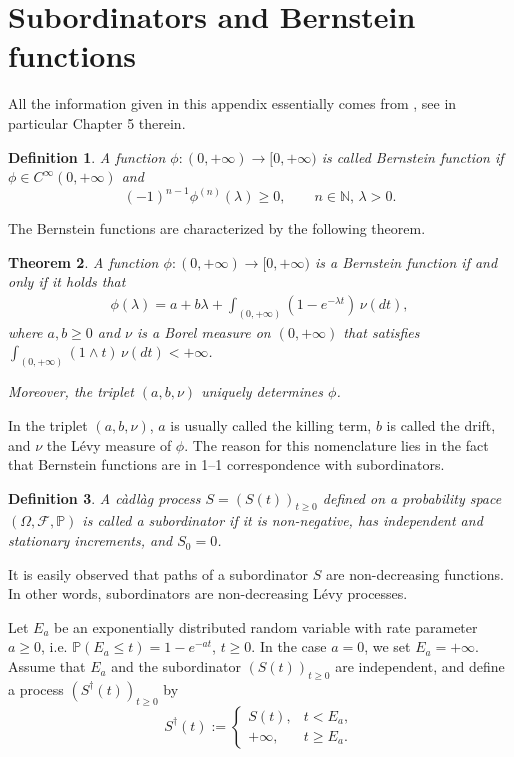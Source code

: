 \documentclass[reqno]{amsart}
\newtheorem{theorem}{Theorem}[section] %
\newtheorem{definition}[theorem]{Definition}
\theoremstyle{remark}
\numberwithin{equation}{section} %
\newcommand{\1}{\mathds{1}}
\begin{document}
	\appendix
	
	\section{Subordinators and Bernstein functions}
	\label{appendix_bernstein}
	
	All the information given in this appendix essentially comes from \cite{bernstein}, see in particular Chapter 5 therein.
	\begin{definition}
		A function $\phi : (0,+\infty) \to [0,+\infty)$ is called Bernstein function if $\phi\in C^{\infty}(0,+\infty)$ and
		$$
		(-1)^{n-1} \phi^{(n)}(\lambda) \ge 0, \qquad n \in \mathbb{N} ,\, \lambda > 0.
		$$
	\end{definition}
	
	The Bernstein functions are characterized by the following theorem. 
	
	\begin{theorem}
		A function $\phi : (0,{+\infty}) \to [0,+\infty)$ is a Bernstein function if and only if it holds that
		\begin{align}
			\phi(\lambda) = a + b \lambda + \int_{(0,{+\infty})} (1 - e^{-\lambda t}) \,\nu(dt),
			\label{A1002}
		\end{align}
		where $a,b \ge 0$ and $\nu$ is a Borel measure on $(0,{+\infty})$ that satisfies $\int_{(0,{+\infty})} (1 \wedge t)\,\nu(dt) < {+\infty}$.
		
		Moreover, the triplet $(a,b,\nu)$ uniquely determines $ \phi$.
	\end{theorem}
	
	In the triplet $(a,b,\nu)$, $a$ is usually called the killing term, $b$ is called the drift, and $\nu$ the L\'evy measure of $\phi$. The reason for this nomenclature lies in the fact that Bernstein functions are in 1--1 correspondence with subordinators.
	
	
	\begin{definition}
		A càdlàg process $S = (S(t))_{t \ge 0}$ defined on a probability space $(\Omega,\mathcal{F},\mathbb{P})$ is called a subordinator if it is non-negative, has independent and stationary increments,  and $S_0 = 0$.
	\end{definition}
	It is easily observed that paths of a subordinator $S$ are non-decreasing functions. In other words, subordinators are non-decreasing L\'evy processes.
	
	Let $E_a$ be an exponentially distributed random variable with rate parameter $a \ge 0$, i.e. $
	\mathbb{P}(E_a \le  t) = 1- e^{-a t}$, $t\ge0$. In the case $a = 0$, we set $E_a = +\infty$. Assume that $E_a$ and the subordinator $(S(t))_{t\ge0}$ are independent, and define a process $({S}^\dagger(t))_{t \ge 0}$ by
	$$
	{S}^\dagger(t) :=
	\begin{cases}
		S(t), & t < E_a, \\
		+\infty, & t \ge E_a.
	\end{cases}
	$$
	
\end{document}
